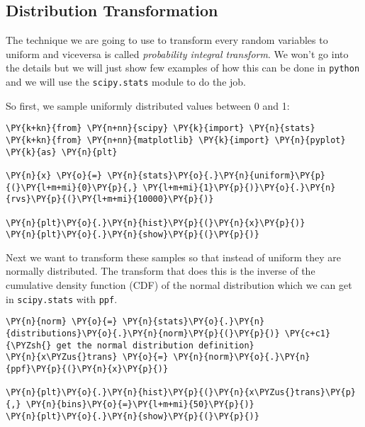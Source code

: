 \subsection{Distribution
Transformation}\label{distribution-transformation}

The technique we are going to use to transform every random variables to
uniform and viceversa is called \emph{probability integral transform}.
We won't go into the details but we will just show few examples of how
this can be done in \texttt{python} and we will use the
\texttt{scipy.stats} module to do the job.

So first, we sample uniformly distributed values between 0 and 1:

    \begin{tcolorbox}[breakable, size=fbox, boxrule=1pt, pad at break*=1mm,colback=cellbackground, colframe=cellborder]
\begin{Verbatim}[commandchars=\\\{\}]
\PY{k+kn}{from} \PY{n+nn}{scipy} \PY{k}{import} \PY{n}{stats}
\PY{k+kn}{from} \PY{n+nn}{matplotlib} \PY{k}{import} \PY{n}{pyplot} \PY{k}{as} \PY{n}{plt}

\PY{n}{x} \PY{o}{=} \PY{n}{stats}\PY{o}{.}\PY{n}{uniform}\PY{p}{(}\PY{l+m+mi}{0}\PY{p}{,} \PY{l+m+mi}{1}\PY{p}{)}\PY{o}{.}\PY{n}{rvs}\PY{p}{(}\PY{l+m+mi}{10000}\PY{p}{)}

\PY{n}{plt}\PY{o}{.}\PY{n}{hist}\PY{p}{(}\PY{n}{x}\PY{p}{)}
\PY{n}{plt}\PY{o}{.}\PY{n}{show}\PY{p}{(}\PY{p}{)}
\end{Verbatim}
\end{tcolorbox}

    
Next we want to transform these samples so that instead of uniform they
are normally distributed. The transform that does this is the inverse of
the cumulative density function (CDF) of the normal distribution which
we can get in \texttt{scipy.stats} with \texttt{ppf}.

    \begin{tcolorbox}[breakable, size=fbox, boxrule=1pt, pad at break*=1mm,colback=cellbackground, colframe=cellborder]
\begin{Verbatim}[commandchars=\\\{\}]
\PY{n}{norm} \PY{o}{=} \PY{n}{stats}\PY{o}{.}\PY{n}{distributions}\PY{o}{.}\PY{n}{norm}\PY{p}{(}\PY{p}{)} \PY{c+c1}{\PYZsh{} get the normal distribution definition}
\PY{n}{x\PYZus{}trans} \PY{o}{=} \PY{n}{norm}\PY{o}{.}\PY{n}{ppf}\PY{p}{(}\PY{n}{x}\PY{p}{)}

\PY{n}{plt}\PY{o}{.}\PY{n}{hist}\PY{p}{(}\PY{n}{x\PYZus{}trans}\PY{p}{,} \PY{n}{bins}\PY{o}{=}\PY{l+m+mi}{50}\PY{p}{)}
\PY{n}{plt}\PY{o}{.}\PY{n}{show}\PY{p}{(}\PY{p}{)}
\end{Verbatim}
\end{tcolorbox}

